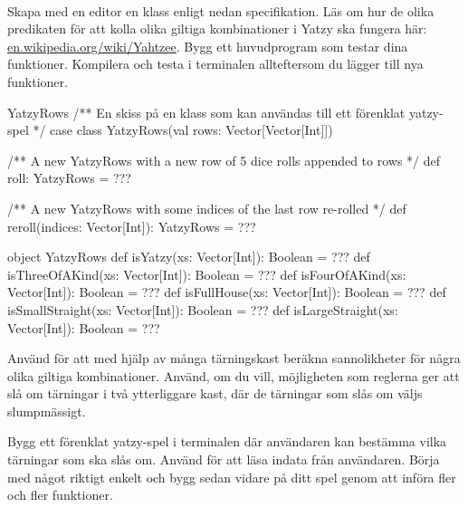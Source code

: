 \Task  \what~ 

\Subtask Skapa med en editor en klass enligt nedan specifikation. Läs om hur de olika predikaten för att kolla olika giltiga kombinationer i Yatzy ska fungera här: \href{https://en.wikipedia.org/wiki/Yahtzee}{en.wikipedia.org/wiki/Yahtzee}. Bygg ett huvudprogram som testar dina funktioner. Kompilera och testa i terminalen allteftersom du lägger till nya funktioner.

\begin{ScalaSpec}{YatzyRows}
/** En skiss på en klass som kan användas till ett förenklat yatzy-spel */
case class YatzyRows(val rows: Vector[Vector[Int]]) {
  /** A new YatzyRows with a new row of 5 dice rolls appended to rows  */
  def roll: YatzyRows = ???

  /** A new YatzyRows with some indices of the last row re-rolled  */
  def reroll(indices: Vector[Int]): YatzyRows = ???
}

object YatzyRows {
  def isYatzy(xs: Vector[Int]): Boolean = ???
  def isThreeOfAKind(xs: Vector[Int]): Boolean = ???
  def isFourOfAKind(xs: Vector[Int]): Boolean = ???
  def isFullHouse(xs: Vector[Int]): Boolean = ???
  def isSmallStraight(xs: Vector[Int]): Boolean = ???
  def isLargeStraight(xs: Vector[Int]): Boolean = ???
}
\end{ScalaSpec}


\Subtask Använd  för att med hjälp av många tärningskast beräkna sannolikheter för några olika giltiga kombinationer. Använd, om du vill, möjligheten som reglerna ger att slå om tärningar i två ytterliggare kast, där de tärningar som slås om väljs slumpmässigt.

\Subtask Bygg ett förenklat yatzy-spel i terminalen där användaren kan bestämma vilka tärningar som ska slås om. Använd  för att läsa indata från användaren. Börja med något riktigt enkelt och bygg sedan vidare på ditt spel genom att införa fler och fler funktioner.


\clearpage


\AdvancedTasks %


\SOLUTION


\TaskSolved \what

